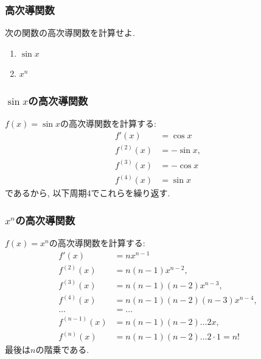 \begin{frame}
\frametitle{高次導関数}

\begin{Prob}
次の関数の高次導関数を計算せよ. 
\begin{enumerate}
\item $\sin x$
\item $x^n$
\end{enumerate}
\end{Prob}


\end{frame}







\begin{frame}
\frametitle{$\sin x$の高次導関数}


$f(x)=\sin x$の高次導関数を計算する: 
\begin{align*}
f'(x) & = \cos x \\
f^{(2)}(x) & = -\sin x, \\
f^{(3)}(x) & = -\cos x \\
f^{(4)}(x) & =  \sin x
\end{align*}
であるから, 以下周期4でこれらを繰り返す. 
\end{frame}







\begin{frame}
\frametitle{$x^n$の高次導関数}


$f(x)=x^n$の高次導関数を計算する: 
\begin{align*}
f'(x) & = nx^{n-1} \\
f^{(2)}(x) & =n(n-1)x^{n-2}, \\
f^{(3)}(x) & = n(n-1)(n-2)x^{n-3}, \\
f^{(4)}(x) & =  n(n-1)(n-2)(n-3)x^{n-4}, \\
\dots & = \dots \\
f^{(n-1)}(x) & =  n(n-1)(n-2) \dots 2x, \\
f^{(n)}(x) & =  n(n-1)(n-2) \dots 2\cdot 1=n! 
\end{align*}
最後は$n$の階乗である. 
\end{frame}



